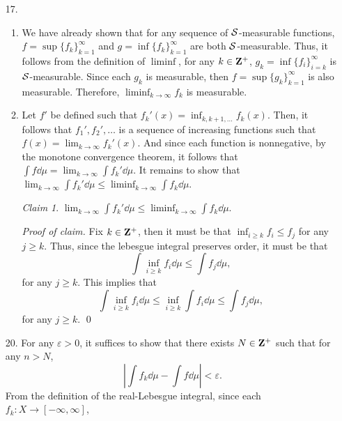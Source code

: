 \documentclass{article}
\newcommand{\eps}{\varepsilon}
\theoremstyle{remark}
\newtheorem{claim}{Claim}
\newenvironment{poc}{\textit{Proof of claim.}}{\qed\\}
\begin{document}
\begin{enumerate}[leftmargin=*]
\begin{poc}
\begin{align*}
            &\leq \mu((-k/2,k/2)) \cdot \frac{1}{k} = 1.
        \end{align*}
    \end{poc}
    Thus, by claim 2, it follows that $\lim_{k\to\infty} \int f_k \dd\lambda = 1$. 
    \item[17.] \begin{enumerate}[label=(\alph*)]
        \item We have already shown that for any sequence of $\mathcal{S}$-measurable functions, $f = \sup\{f_k\}_{k=1}^\infty$ and $g = \inf\{f_k\}_{k=1}^\infty$
        are both $\mathcal{S}$-measurable. Thus, it follows from the definition of $\liminf$, for any $k\in\mathbf{Z}^+$, $g_k = \inf\{f_i\}_{i=k}^\infty$
        is $\mathcal{S}$-measurable. Since each $g_k$ is measurable, then $f = \sup \{g_k\}_{k=1}^\infty$ is also measurable. Therefore, 
        $\liminf_{k\to\infty} f_k$ is measurable.
        \item Let $f'$ be defined such that $f_k'(x) = \inf_{k,k+1,\ldots} f_k(x)$. Then, it follows that $f_1', f_2', \ldots$ is a sequence 
        of increasing functions such that $f(x) = \lim_{k\to\infty} f_k'(x)$. And since each function is nonnegative, by the monotone convergence theorem, 
        it follows that $\int f \dd\mu = \lim_{k\to\infty} \int f_k'\dd\mu$. It remains to show that $\lim_{k\to\infty} \int f_k'\dd\mu \leq \liminf_{k\to\infty} \int f_k \dd\mu$.
        \begin{claim}
            $\lim_{k\to\infty} \int f_k' \dd\mu \leq \liminf_{k\to\infty} \int f_k \dd\mu$. 
        \end{claim}
        \begin{poc}
            Fix $k \in \mathbf{Z}^+$, then it must be that $\inf_{i \geq k} f_i \leq f_j$ for any $j \geq k$. Thus, since the lebesgue integral preserves order,
            it must be that 
            \[
                \int \inf_{i \geq k} f_i \dd\mu \leq \int f_j \dd\mu,  
            \]
            for any $j \geq k$. This implies that 
            \[
                \int \inf_{i \geq k} f_i \dd\mu \leq \inf_{i \geq k} \int f_i \dd\mu \leq \int f_j \dd\mu,  
            \]
            for any $j \geq k$. 
        \end{poc}
    \end{enumerate}
    \item[20.] For any $\eps > 0$, it suffices to show that there exists $N \in \mathbf{Z}^+$ such that for any $n > N$, 
    \[
        \left|\int f_k \dd\mu - \int f \dd\mu \right| < \eps. 
    \]
    From the definition of the real-Lebesgue integral, since each $f_k: X \to [-\infty, \infty]$,

\end{enumerate}
\end{document}
